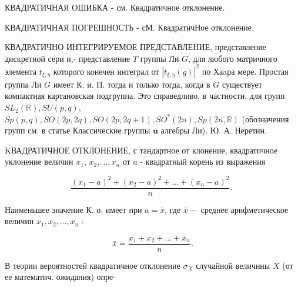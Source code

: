 \documentclass[10pt]{article}
\begin{document}
КВАДРАТИЧНАЯ ОШИБКА - см. Квадратичное отклонение.



КВАДРАТИЧНАЯ ПОГРЕШНОСТЬ - сМ. КвадратичНое отклонение.



КВАДРАТИЧНО ИНТЕГРИРУЕМОЕ ПРЕДСТАВЛЕHИЕ, представление дискретной сери и,- представление $T$ группы Ли $G$, для любого матричного элемента $t_{\xi, \eta}$ которого конечен интеграл от $\left|t_{\xi, \eta}(g)\right|^{2}$ по Хаaра мере. Простая группа Ли $G$ имеет К. и. П. тогда и только тогда, когда в $G$ существует компактная картановская подгруппа. Это справедливо, в частности, для групп $S L_{2}(\mathbb{R}), S U(p, q)$, $S p(p, q), S O(2 p, 2 q), S O(2 p, 2 q+1), S O^{*}(2 n), S p(2 n, \mathbb{R})$ (обозначения групп см. в статье Классические группы $\boldsymbol{u}$ алгебры Ли). Ю. А. Неретин.



KВАДРАТИЧНОЕ ОТКЛОНЕНИЕ, с тандартное от клонение, квадратичное уклонение величин $x_{1}$, $x_{2}, \ldots, x_{n}$ от $a$ - квадратный корень из выражения



\[

\frac{\left(x_{1}-a\right)^{2}+\left(x_{2}-a\right)^{2}+\ldots+\left(x_{n}-a\right)^{2}}{n} \text {. }

\]



Наименьшее значение К. о. имеет при $a=\bar{x}$, где $\bar{x}-$ среднее арифметическое величин $x_{1}, x_{2}, \ldots, x_{n}$ :



\[

\bar{x}=\frac{x_{1}+x_{2}+\ldots+x_{n}}{n} .

\]



В теории вероятностей квадратичное отклонение $\sigma_{X}$ случайной величины $X$ (от ее математич. ожидания) опре-
\end{document}
